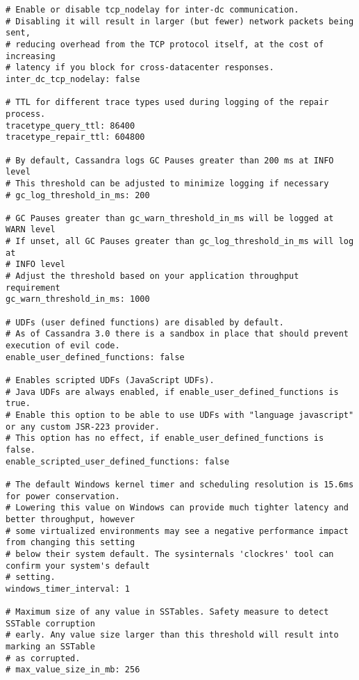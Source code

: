 \begin{verbatim}
# Enable or disable tcp_nodelay for inter-dc communication.
# Disabling it will result in larger (but fewer) network packets being sent,
# reducing overhead from the TCP protocol itself, at the cost of increasing
# latency if you block for cross-datacenter responses.
inter_dc_tcp_nodelay: false

# TTL for different trace types used during logging of the repair process.
tracetype_query_ttl: 86400
tracetype_repair_ttl: 604800

# By default, Cassandra logs GC Pauses greater than 200 ms at INFO level
# This threshold can be adjusted to minimize logging if necessary
# gc_log_threshold_in_ms: 200

# GC Pauses greater than gc_warn_threshold_in_ms will be logged at WARN level
# If unset, all GC Pauses greater than gc_log_threshold_in_ms will log at
# INFO level
# Adjust the threshold based on your application throughput requirement
gc_warn_threshold_in_ms: 1000

# UDFs (user defined functions) are disabled by default.
# As of Cassandra 3.0 there is a sandbox in place that should prevent execution of evil code.
enable_user_defined_functions: false

# Enables scripted UDFs (JavaScript UDFs).
# Java UDFs are always enabled, if enable_user_defined_functions is true.
# Enable this option to be able to use UDFs with "language javascript" or any custom JSR-223 provider.
# This option has no effect, if enable_user_defined_functions is false.
enable_scripted_user_defined_functions: false

# The default Windows kernel timer and scheduling resolution is 15.6ms for power conservation.
# Lowering this value on Windows can provide much tighter latency and better throughput, however
# some virtualized environments may see a negative performance impact from changing this setting
# below their system default. The sysinternals 'clockres' tool can confirm your system's default
# setting.
windows_timer_interval: 1

# Maximum size of any value in SSTables. Safety measure to detect SSTable corruption
# early. Any value size larger than this threshold will result into marking an SSTable
# as corrupted.
# max_value_size_in_mb: 256
\end{verbatim}